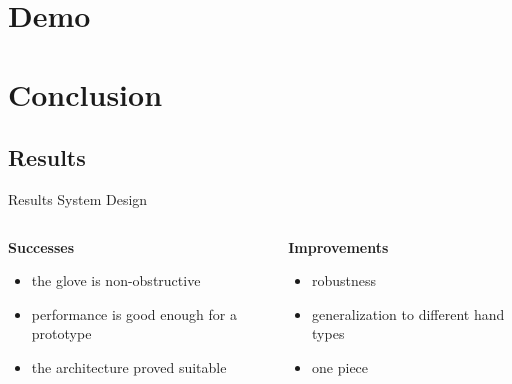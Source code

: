 \section{Demo}

\section{Conclusion}
\subsection{Results}

\begin{frame}{Results System Design}
    \begin{columns}[T]
        \begin{column}{0.5\textwidth}
            \textbf{Successes}
            \begin{itemize}
                \item the glove is non-obstructive
                \item performance is good enough for a prototype
                \item the architecture proved suitable
            \end{itemize}
        \end{column}
        \begin{column}{0.5\textwidth}
            \textbf{Improvements}
            \begin{itemize}
                \item robustness
                \item generalization to different hand types
                \item one piece
            \end{itemize}
        \end{column}
    \end{columns}
\end{frame}

